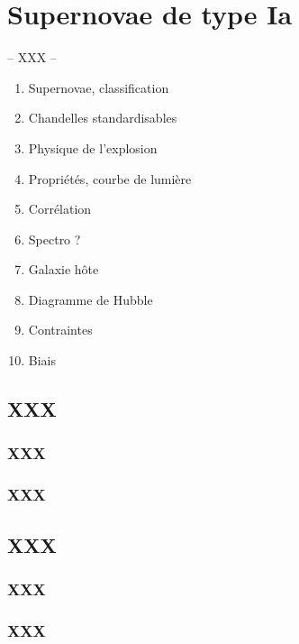 \documentclass[../main/main.tex]{subfiles}
\begin{document}
\chapter{Supernovae de type Ia}\label{ch:sne}

-- XXX --

\minitoc
\begin{enumerate}
    \item Supernovae, classification
    \item Chandelles standardisables
    \item Physique de l'explosion
    \item Propriétés, courbe de lumière
    \item Corrélation
    \item Spectro ?
    \item Galaxie hôte
    \item Diagramme de Hubble
    \item Contraintes
    \item Biais

\end{enumerate}
\newpage

\section{XXX}

\subsection{XXX}

\subsection{XXX}


\section{XXX}

\subsection{XXX}

\subsection{XXX}
\end{document}
